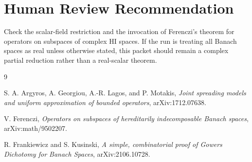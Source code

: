 \documentclass[11pt]{article}
\begin{document}
\section*{Human Review Recommendation}

Check the scalar-field restriction and the invocation of Ferenczi's theorem for
operators on subspaces of complex HI spaces. If the run is treating all Banach
spaces as real unless otherwise stated, this packet should remain a complex
partial reduction rather than a real-scalar theorem.

\begin{thebibliography}{9}

S. A. Argyros, A. Georgiou, A.-R. Lagos, and P. Motakis,
\emph{Joint spreading models and uniform approximation of bounded operators},
arXiv:1712.07638.

V. Ferenczi,
\emph{Operators on subspaces of hereditarily indecomposable Banach spaces},
arXiv:math/9502207.

R. Frankiewicz and S. Kusinski,
\emph{A simple, combinatorial proof of Gowers Dichotomy for Banach Spaces},
arXiv:2106.10728.

\end{thebibliography}
\end{document}
